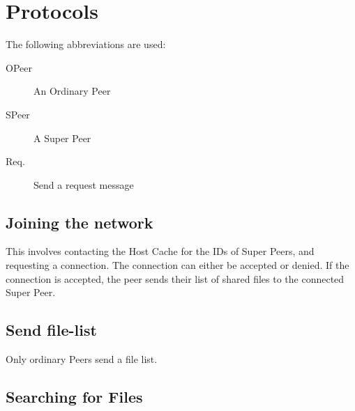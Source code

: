 \section{Protocols}

\secttoc

The following abbreviations are used:

\begin{description}
  \item[OPeer] An Ordinary Peer
  \item[SPeer] A Super Peer
  \item[Req.] Send a request message
\end{description}

\subsection{Joining the network}

This involves contacting the Host Cache for the IDs of Super Peers, and
requesting a connection.  The connection can either be accepted or denied. If
the connection is accepted, the peer sends their list of shared files to the
connected Super Peer.

\noindent{}

\subsection{Send file-list}

Only ordinary Peers send a file list.

\noindent{}

\subsection{Searching for Files}

